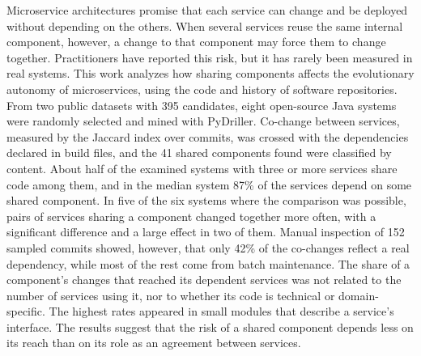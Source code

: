 Microservice architectures promise that each service can change and be deployed without depending on the others. When several services reuse the same internal component, however, a change to that component may force them to change together. Practitioners have reported this risk, but it has rarely been measured in real systems. This work analyzes how sharing components affects the evolutionary autonomy of microservices, using the code and history of software repositories. From two public datasets with 395 candidates, eight open-source Java systems were randomly selected and mined with PyDriller. Co-change between services, measured by the Jaccard index over commits, was crossed with the dependencies declared in build files, and the 41 shared components found were classified by content. About half of the examined systems with three or more services share code among them, and in the median system 87\% of the services depend on some shared component. In five of the six systems where the comparison was possible, pairs of services sharing a component changed together more often, with a significant difference and a large effect in two of them. Manual inspection of 152 sampled commits showed, however, that only 42\% of the co-changes reflect a real dependency, while most of the rest come from batch maintenance. The share of a component's changes that reached its dependent services was not related to the number of services using it, nor to whether its code is technical or domain-specific. The highest rates appeared in small modules that describe a service's interface. The results suggest that the risk of a shared component depends less on its reach than on its role as an agreement between services.

